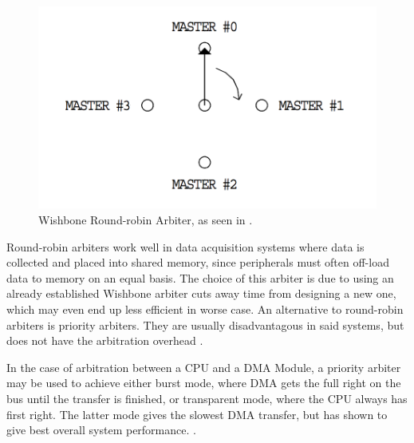 \begin{figure}[htb]
    \centering
    \includegraphics[width=1.0\textwidth]{Figures/Tile/WBArbiter}
    \caption{Wishbone Round-robin Arbiter, as seen in \cite{WBLibrary}.}
    \label{fig:WBArbiter}
\end{figure}

Round-robin arbiters work well in data acquisition systems where data is collected and placed into shared memory, since peripherals must often off-load data to memory on an equal basis.
The choice of this arbiter is due to using an already established Wishbone arbiter cuts away time from designing a new one, which may even end up less efficient in worse case.
An alternative to round-robin arbiters is priority arbiters.
They are usually disadvantagous in said systems, but does not have the arbitration overhead \cite{WBLibrary}.

In the case of arbitration between a CPU and a DMA Module, a priority arbiter may be used to achieve either burst mode, where DMA gets the full right on the bus until the transfer is finished, or transparent mode, where the CPU always has first right.
The latter mode gives the slowest DMA transfer, but has shown to give best overall system performance.  \cite{DMA-lecture}.

